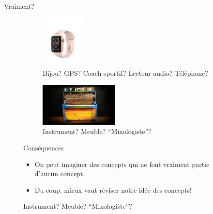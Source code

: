 \documentclass[xcolor=table, hyperref={pdfpagelabels=false}]{beamer}
\begin{document}
\begin{frame}{Vraiment?}
\begin{figure}
	\centering
	\begin{subfigure}[b]{.45\textwidth}
		\centering
		\includegraphics[height=100px]{./images/apple_watch.jpeg}
		\caption{Bijou? GPS? Coach sportif? Lecteur audio? Téléphone?}
	\end{subfigure}\pause
	\begin{subfigure}[b]{.45\textwidth}
		\centering
		\includegraphics[width=150px]{./images/pianocktail1.jpg}
		\caption{Instrument? Meuble? ``Mixologiste''?}
	\end{subfigure}\pause
	\begin{block}{Conséquences}
		\begin{itemize}
			\item On peut imaginer des concepts qui ne font vraiment partie d'aucun concept.\pause
			\item Du coup, mieux vaut réviser notre idée des concepts!
		\end{itemize}
	\end{block}
\end{figure}
\end{frame}
\end{document}
